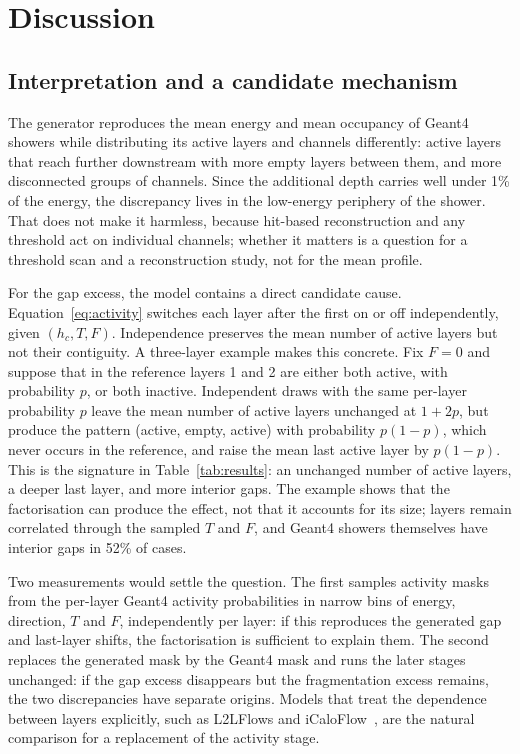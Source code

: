 \documentclass[11pt]{article}
\begin{document}
\FloatBarrier
\section{Discussion}
\label{sec:discussion}

\subsection{Interpretation and a candidate mechanism}
\label{sec:interpretation}

The generator reproduces the mean energy and mean occupancy of Geant4 showers while distributing its active layers and channels differently: active layers that reach further downstream with more empty layers between them, and more disconnected groups of channels. Since the additional depth carries well under 1\% of the energy, the discrepancy lives in the low-energy periphery of the shower. That does not make it harmless, because hit-based reconstruction and any threshold act on individual channels; whether it matters is a question for a threshold scan and a reconstruction study, not for the mean profile.

For the gap excess, the model contains a direct candidate cause. Equation~\eqref{eq:activity} switches each layer after the first on or off independently, given $(h_c,T,F)$. Independence preserves the mean number of active layers but not their contiguity. A three-layer example makes this concrete. Fix $F=0$ and suppose that in the reference layers 1 and 2 are either both active, with probability $p$, or both inactive. Independent draws with the same per-layer probability $p$ leave the mean number of active layers unchanged at $1+2p$, but produce the pattern (active, empty, active) with probability $p(1-p)$, which never occurs in the reference, and raise the mean last active layer by $p(1-p)$. This is the signature in Table~\ref{tab:results}: an unchanged number of active layers, a deeper last layer, and more interior gaps. The example shows that the factorisation can produce the effect, not that it accounts for its size; layers remain correlated through the sampled $T$ and $F$, and Geant4 showers themselves have interior gaps in 52\% of cases.

Two measurements would settle the question. The first samples activity masks from the per-layer Geant4 activity probabilities in narrow bins of energy, direction, $T$ and $F$, independently per layer: if this reproduces the generated gap and last-layer shifts, the factorisation is sufficient to explain them. The second replaces the generated mask by the Geant4 mask and runs the later stages unchanged: if the gap excess disappears but the fragmentation excess remains, the two discrepancies have separate origins. Models that treat the dependence between layers explicitly, such as L2LFlows and iCaloFlow~\cite{l2lflows,icaloflow}, are the natural comparison for a replacement of the activity stage.
\end{document}

